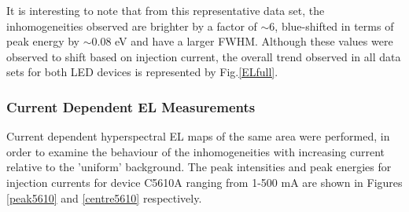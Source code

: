 \FloatBarrier 

It is interesting to note that from this representative data set, the inhomogeneities observed are brighter by a factor of $\sim 6$, blue-shifted in terms of peak energy by $\sim 0.08$ eV and have a larger FWHM. Although these values were observed to shift based on injection current, the overall trend observed in all data sets for both LED devices is represented by Fig.\ref{ELfull}.

\subsubsection{Current Dependent EL Measurements}

Current dependent hyperspectral EL maps of the same area were performed, in order to examine the behaviour of the inhomogeneities with increasing current relative to the 'uniform' background. The peak intensities and peak energies for injection currents for device C5610A ranging from 1-500 mA are shown in Figures \ref{peak5610} and \ref{centre5610} respectively. 

